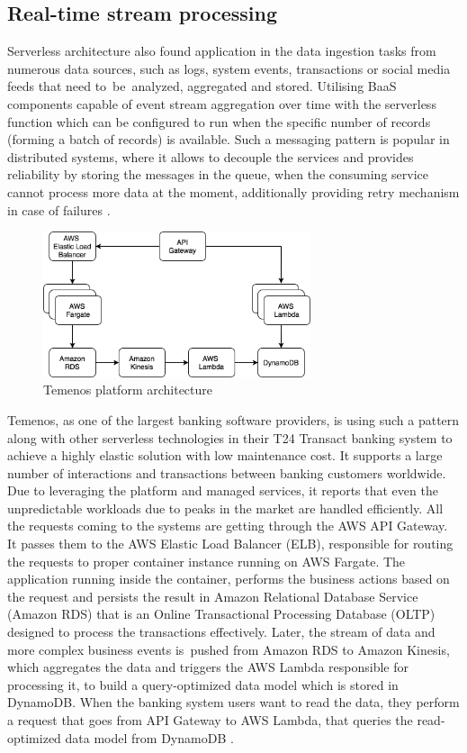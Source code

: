 \subsection{Real-time stream processing}

Serverless architecture also found application in the data ingestion tasks from numerous data sources, such as logs, system events, transactions or social media feeds that need to~be~analyzed, aggregated and stored. Utilising BaaS components capable of event stream aggregation over time with the serverless function which can be configured to run when the specific number of records (forming a batch of records) is available. Such a messaging pattern is popular in distributed systems, where it allows to decouple the services and provides reliability by storing the messages in the queue, when the consuming service cannot process more data at the moment, additionally providing retry mechanism in case of failures \cite{ServerlessArchitectureOnAWS}.

\begin{figure}[h]
    \centering
    \includegraphics[width=0.7\textwidth]{assets/02-serverless/TemenosArchitecture.png}
    \caption{Temenos platform architecture}
    \label{fig:temenos-architecture-diagram}
\end{figure}

Temenos, as one of the largest banking software providers, is using such a pattern along with other serverless technologies in their T24 Transact banking system to achieve a highly elastic solution with low maintenance cost. It supports a large number of interactions and transactions between banking customers worldwide. Due to leveraging the platform and managed services, it reports that even the unpredictable workloads due to peaks in the market are handled efficiently. All the requests coming to the systems are getting through the AWS API Gateway. It passes them to the AWS Elastic Load Balancer (ELB), responsible for routing the requests to proper container instance running on AWS Fargate. The application running inside the container, performs the business actions based on the request and persists the result in Amazon Relational Database Service (Amazon RDS) that is an Online Transactional Processing Database (OLTP) designed to process the transactions effectively. Later, the stream of data and more complex business events is~pushed from Amazon RDS to Amazon Kinesis, which aggregates the data and triggers the AWS Lambda responsible for processing it, to build a query-optimized data model which is stored in DynamoDB. When the banking system users want to read the data, they perform a request that goes from API Gateway to AWS Lambda, that queries the read-optimized data model from DynamoDB \cite{ThisIsMyAchitectureTemenos}.

